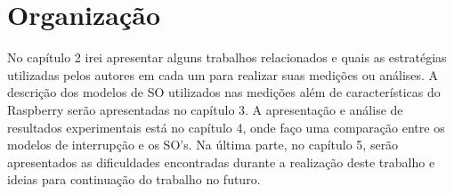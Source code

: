 \section{Organização}

No capítulo 2 irei apresentar alguns trabalhos relacionados e quais as estratégias utilizadas pelos autores em cada um para realizar suas medições ou análises. A descrição dos modelos de SO utilizados nas medições além de características do Raspberry serão apresentadas no capítulo 3. A apresentação e análise de resultados experimentais está no capítulo 4, onde faço uma comparação entre os modelos de interrupção e os SO's. Na última parte, no capítulo 5, serão apresentados as dificuldades encontradas durante a realização deste trabalho e ideias para continuação do trabalho no futuro.